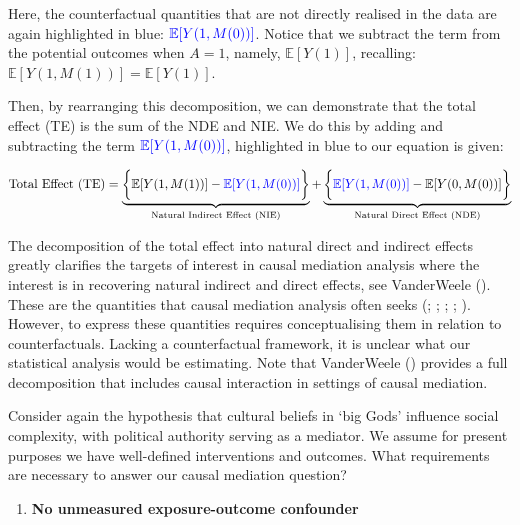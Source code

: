 \documentclass[
  single column]{article}
\providecommand{\tightlist}{%
  \setlength{\itemsep}{0pt}\setlength{\parskip}{0pt}}\usepackage{longtable,booktabs,array}
\begin{document}
Here, the counterfactual quantities that are not directly realised in
the data are again highlighted in blue:
\(\textcolor{blue}{\mathbb{E}[Y(1, M(0))]}\). Notice that we subtract
the term from the potential outcomes when \(A=1\), namely,
\(\mathbb{E}[Y(1)]\), recalling:
\(\mathbb{E}[Y(1, M(1))] = \mathbb{E}[Y(1)]\).

Then, by rearranging this decomposition, we can demonstrate that the
total effect (TE) is the sum of the NDE and NIE. We do this by adding
and subtracting the term \(\textcolor{blue}{\mathbb{E}[Y(1, M(0))]}\),
highlighted in blue to our equation is given:

\[
\text{Total Effect (TE)} = \underbrace{\bigg\{\mathbb{E}[Y(1, M(1))] - \textcolor{blue}{\mathbb{E}[Y(1, M(0))]}\bigg\}}_{\text{Natural Indirect Effect (NIE)}} + \underbrace{\bigg\{\textcolor{blue}{\mathbb{E}[Y(1, M(0))]} - \mathbb{E}[Y(0, M(0))]\bigg\}}_{\text{Natural Direct Effect (NDE)}}
\]

The decomposition of the total effect into natural direct and indirect
effects greatly clarifies the targets of interest in causal mediation
analysis where the interest is in recovering natural indirect and direct
effects, see VanderWeele (). These
are the quantities that causal mediation analysis often seeks
(;
;
;
;
).
However, to express these quantities requires conceptualising them in
relation to counterfactuals. Lacking a counterfactual framework, it is
unclear what our statistical analysis would be estimating. Note that
VanderWeele () provides a full
decomposition that includes causal interaction in settings of causal
mediation.

Consider again the hypothesis that cultural beliefs in `big Gods'
influence social complexity, with political authority serving as a
mediator. We assume for present purposes we have well-defined
interventions and outcomes. What requirements are necessary to answer
our causal mediation question?

\begin{enumerate}
\def\labelenumi{\arabic{enumi}.}
\tightlist
\item
  \textbf{No unmeasured exposure-outcome confounder}
\end{enumerate}
\end{document}
